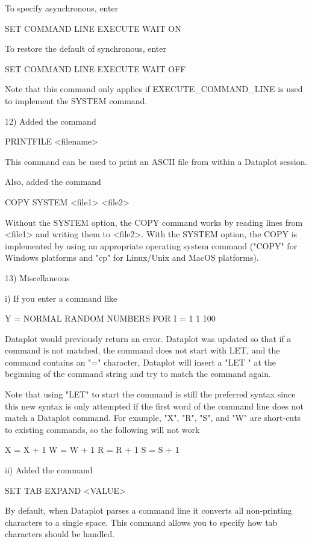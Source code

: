          To specify asynchronous, enter

             SET COMMAND LINE EXECUTE WAIT ON

         To restore the default of synchronous, enter

             SET COMMAND LINE EXECUTE WAIT OFF

         Note that this command only applies if EXECUTE_COMMAND_LINE is
         used to implement the SYSTEM command.

12) Added the command

      PRINTFILE <filename>

    This command can be used to print an ASCII file from within a
    Dataplot session.

    Also, added the command

       COPY SYSTEM <file1> <file2>

    Without the SYSTEM option, the COPY command works by reading lines
    from <file1> and writing them to <file2>.  With the SYSTEM option,
    the COPY is implemented by using an appropriate operating system
    command ("COPY" for Windows platforms and "cp" for Linux/Unix and
    MacOS platforms).

13) Miscellaneous

      i) If you enter a command like

            Y = NORMAL RANDOM NUMBERS FOR I = 1 1 100

         Dataplot would previously return an error.  Dataplot was
         updated so that if a command is not matched, the command
         does not start with LET, and the command contains an
         "=" character, Dataplot will insert a "LET " at the
         beginning of the command string and try to match the command
         again.

         Note that using "LET" to start the command is still the
         preferred syntax since this new syntax is only attempted if
         the first word of the command line does not match a
         Dataplot command.  For example, "X", "R", "S", and "W"
         are short-cuts to existing commands, so the following
         will not work

             X = X + 1
             W = W + 1
             R = R + 1
             S = S + 1

     ii) Added the command

            SET TAB EXPAND <VALUE>

         By default, when Dataplot parses a command line it converts
         all non-printing characters to a single space.  This command
         allows you to specify how tab characters should be handled.

